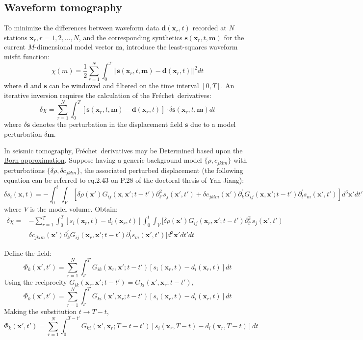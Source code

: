 \documentclass{article}
\newcommand{\mbf}[1]{\mathbf{#1}}
\newcommand{\myem}[1]{{\color{red}\uline{#1}}}
\newcommand{\Frechet}{Fr\'{e}chet~}
\begin{document}
\subsection{Waveform tomography}
To minimize the differences between waveform data $\mbf d(\mbf x_r,t)$ recorded at $N$ stations $\mbf x_r,r=1,2,\ldots,N$, and the corresponding synthetics $\mbf s(\mbf x_r,t,\mbf m)$ for the current $M$-dimensional model vector $\mbf m$, introduce the least-squares waveform misfit function:
\[ \chi(m)=\frac{1}{2}\sum_{r=1}^N\int_0^T||\mbf s(\mbf x_r,t,\mbf m)-\mbf d(\mbf x_r,t)||^2dt \]
where $\mbf d$ and $\mbf s$ can be windowed and filtered on the time interval $[0,T]$. An iterative inversion requires the calculation of the \Frechet derivatives:
\[ \delta\chi=\sum_{r=1}^N\int_0^T[\mbf s(\mbf x_r,t,\mbf m)-\mbf d(\mbf x_r,t)]\cdot\delta\mbf s(\mbf x_r,t,\mbf m)dt \]
where $\delta\mbf s$ denotes the perturbation in the displacement field $\mbf s$ due to a model perturbation $\delta\mbf m$.\par
In seismic tomography, \Frechet derivatives may be Determined based upon the \myem{Born approximation}. Suppose having a generic background model $\{\rho,c_{jklm}\}$ with perturbations $\{\delta\rho,\delta c_{jklm}\}$, the associated perturbed displacement (the following equation can be referred to eq.2.43 on P.28 of the doctoral thesis of Yan Jiang):
\[ \delta s_i(\mbf x,t)=-\int_0^t\int_V[\delta\rho(\mbf x')G_{ij}(\mbf x,\mbf x';t-t')\partial_{t'}^2s_j(\mbf x',t')+\delta c_{jklm}(\mbf x')\partial_k^\prime G_{ij}(\mbf x,\mbf x';t-t')\partial_l^\prime s_m(\mbf x',t')]d^3\mbf x'dt' \]
where $V$ is the model volume. Obtain:
\begin{align*}
  \delta\chi= & -\sum_{r=1}^T\int_0^T[s_i(\mbf x_r,t)-d_i(\mbf x_r,t)]\int_0^t\int_V[\delta\rho(\mbf x')G_{ij}(\mbf x_r,\mbf x';t-t')\partial_{t'}^2s_j(\mbf x',t') \\
    & \delta c_{jklm}(\mbf x')\partial_k^\prime G_{ij}(\mbf x_r,\mbf x';t-t')\partial_l^\prime s_m(\mbf x',t')]d^3\mbf x'dt'dt
\end{align*}\par
Define the field:
\[ \Phi_k(\mbf x',t')=\sum_{r=1}^N\int_{t'}^TG_{ik}(\mbf x_r,\mbf x';t-t')[s_i(\mbf x_r,t)-d_i(\mbf x_r,t)]dt \]
Using the reciprocity $G_{ik}(\mbf x_r,\mbf x';t-t')=G_{ki}(\mbf x',\mbf x_r;t-t')$,
\[ \Phi_k(\mbf x',t')=\sum_{r=1}^N\int_{t'}^TG_{ki}(\mbf x',\mbf x_r;t-t')[s_i(\mbf x_r,t)-d_i(\mbf x_r,t)]dt \]
Making the substitution $t\rightarrow T-t$,
\[ \Phi_k(\mbf x',t')=\sum_{r=1}^N\int_0^{T-t'}G_{ki}(\mbf x',\mbf x_r;T-t-t')[s_i(\mbf x_r,T-t)-d_i(\mbf x_r,T-t)]dt \]
\end{document}

